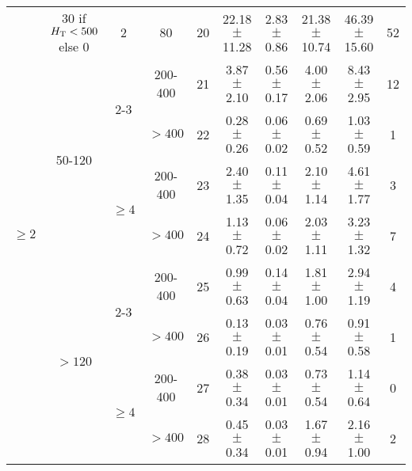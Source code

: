 \begin{table}
{\begin{minipage}{\textwidth}
\begin{tabular}{|c|c|c|c|c|c|c|c|c|c|}
\multirow{9}{*}{$\geq 2$} & 30 if $H_{\mathrm{T}}<500$ else 0  & 2                         & 80      & 20 & 22.18$\pm$11.28   & 2.83$\pm$0.86  & 21.38$\pm$10.74   & 46.39$\pm$15.60   & 52       \\ \cline{2-5}
                          & \multirow{4}{*}{50-120} & \multirow{2}{*}{2-3}      & 200-400 & 21 & 3.87$\pm$2.10     & 0.56$\pm$0.17  & 4.00$\pm$2.06     & 8.43$\pm$2.95     & 12       \\ \cline{4-5}
                          &                         &                           & $>400$  & 22 & 0.28$\pm$0.26     & 0.06$\pm$0.02  & 0.69$\pm$0.52     & 1.03$\pm$0.59     & 1        \\ \cline{3-5}
                          &                         & \multirow{2}{*}{$\geq 4$} & 200-400 & 23 & 2.40$\pm$1.35     & 0.11$\pm$0.04  & 2.10$\pm$1.14     & 4.61$\pm$1.77     & 3        \\ \cline{4-5}
                          &                         &                           & $>400$  & 24 & 1.13$\pm$0.72     & 0.06$\pm$0.02  & 2.03$\pm$1.11     & 3.23$\pm$1.32     & 7        \\ \cline{2-5}
                          & \multirow{4}{*}{$>120$} & \multirow{2}{*}{2-3}      & 200-400 & 25 & 0.99$\pm$0.63     & 0.14$\pm$0.04  & 1.81$\pm$1.00     & 2.94$\pm$1.19     & 4        \\ \cline{4-5}
                          &                         &                           & $>400$  & 26 & 0.13$\pm$0.19     & 0.03$\pm$0.01  & 0.76$\pm$0.54     & 0.91$\pm$0.58     & 1        \\ \cline{3-5}
                          &                         & \multirow{2}{*}{$\geq 4$} & 200-400 & 27 & 0.38$\pm$0.34     & 0.03$\pm$0.01  & 0.73$\pm$0.54     & 1.14$\pm$0.64     & 0        \\ \cline{4-5}
                          &                         &                           & $>400$  & 28 & 0.45$\pm$0.34     & 0.03$\pm$0.01  & 1.67$\pm$0.94     & 2.16$\pm$1.00     & 2        \\ \hline
\end{tabular}
\end{minipage}
}
\end{table}

